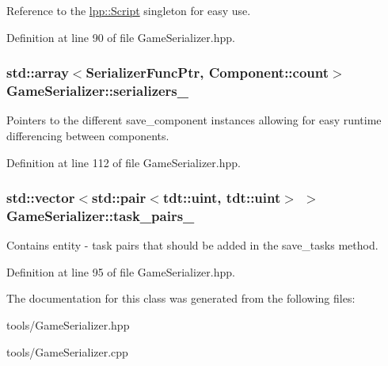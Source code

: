 Reference to the \hyperlink{classlpp_1_1_script}{lpp\+::\+Script} singleton for easy use. 



Definition at line 90 of file Game\+Serializer.\+hpp.

\subsubsection[{\texorpdfstring{serializers\+\_\+}{serializers_}}]{\setlength{\rightskip}{0pt plus 5cm}std\+::array$<$Serializer\+Func\+Ptr, Component\+::count$>$ Game\+Serializer\+::serializers\+\_\+\hspace{0.3cm}{\ttfamily [private]}}\hypertarget{class_game_serializer_a0baa52b5d165843f904c9f72aac5a640}{}\label{class_game_serializer_a0baa52b5d165843f904c9f72aac5a640}


Pointers to the different save\+\_\+component instances allowing for easy runtime differencing between components. 



Definition at line 112 of file Game\+Serializer.\+hpp.

\subsubsection[{\texorpdfstring{task\+\_\+pairs\+\_\+}{task_pairs_}}]{\setlength{\rightskip}{0pt plus 5cm}std\+::vector$<$std\+::pair$<$tdt\+::uint, tdt\+::uint$>$ $>$ Game\+Serializer\+::task\+\_\+pairs\+\_\+\hspace{0.3cm}{\ttfamily [private]}}\hypertarget{class_game_serializer_a556001cdf90fde90c842100db0cda29a}{}\label{class_game_serializer_a556001cdf90fde90c842100db0cda29a}


Contains entity -\/ task pairs that should be added in the save\+\_\+tasks method. 



Definition at line 95 of file Game\+Serializer.\+hpp.



The documentation for this class was generated from the following files\+:\begin{DoxyCompactItemize}
\item 
tools/Game\+Serializer.\+hpp\item 
tools/Game\+Serializer.\+cpp\end{DoxyCompactItemize}
